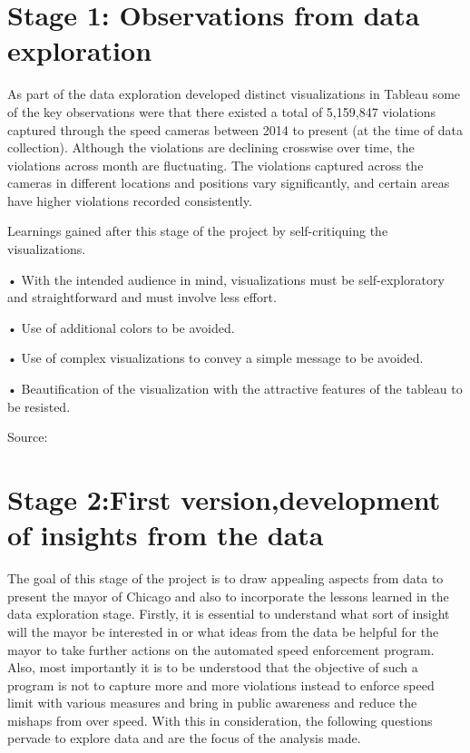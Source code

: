 \documentclass[]{book}
\begin{document}
\hypertarget{stage-1-observations-from-data-exploration}{%
\chapter{Stage 1: Observations from data exploration}\label{stage-1-observations-from-data-exploration}}

As part of the data exploration developed distinct visualizations in Tableau some of the key observations were that there existed a total of 5,159,847 violations captured through the speed cameras between 2014 to present (at the time of data collection). Although the violations are declining crosswise over time, the violations across month are fluctuating. The violations captured across the cameras in different locations and positions vary significantly, and certain areas have higher violations recorded consistently.

Learnings gained after this stage of the project by self-critiquing the visualizations.

• With the intended audience in mind, visualizations must be self-exploratory and straightforward and must involve less effort.

• Use of additional colors to be avoided.

• Use of complex visualizations to convey a simple message to be avoided.

• Beautification of the visualization with the attractive features of the tableau to be resisted.

Source: \citep{dataexp}

\hypertarget{stage-2first-versiondevelopment-of-insights-from-the-data}{%
\chapter{Stage 2:First version,development of insights from the data}\label{stage-2first-versiondevelopment-of-insights-from-the-data}}

The goal of this stage of the project is to draw appealing aspects from data to present the mayor of Chicago and also to incorporate the lessons learned in the data exploration stage.
Firstly, it is essential to understand what sort of insight will the mayor be interested in or what ideas from the data be helpful for the mayor to take further actions on the automated speed enforcement program. Also, most importantly it is to be understood that the objective of such a program is not to capture more and more violations instead to enforce speed limit with various measures and bring in public awareness and reduce the mishaps from over speed. With this in consideration, the following questions pervade to explore data and are the focus of the analysis made.
\end{document}
